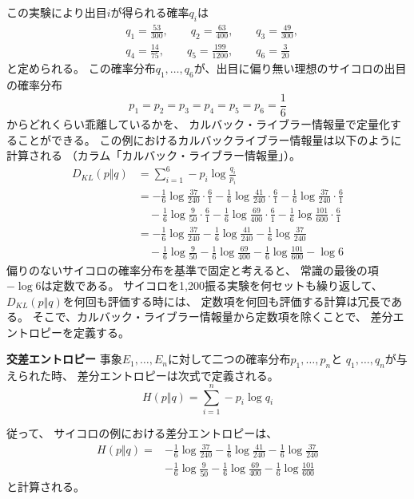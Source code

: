 この実験により出目$i$が得られる確率$q_i$は
\begin{align*}
  &
    q_1 = \frac{53}{300}, \qquad
q_2 = \frac{63}{400}, \qquad
    q_3 = \frac{49}{300},
    \\&
q_4 = \frac{14}{75}, \qquad
q_5 = \frac{199}{1200}, \qquad
q_6 = \frac{3}{20}    
\end{align*}
と定められる。
この確率分布$q_1, \dots, q_6$が、出目に偏り無い理想のサイコロの出目の確率分布
\[
  p_1 = p_2 = p_3 = p_4 = p_5 = p_6 = \frac 16
\]
からどれくらい乖離しているかを、
カルバック・ライブラー情報量で定量化することができる。
この例におけるカルバックライブラー情報量は以下のように計算される
（カラム「カルバック・ライブラー情報量」）。
\begin{align*}
  D_{KL}(p \Vert q)
  & 
    = \sum_{i = 1}^6 - p_i \log \frac{q_i}{p_i}
  \\&
  = - \frac 16 \log \frac{37}{240} \cdot \frac 61
  - \frac 16 \log \frac{41}{240} \cdot \frac 61
  - \frac 16 \log \frac{37}{240} \cdot \frac 61
  \\&\quad
  - \frac 16 \log \frac{9}{50} \cdot \frac 61
  - \frac 16 \log \frac{69}{400} \cdot \frac 61
  - \frac 16 \log \frac{101}{600} \cdot \frac 61
  \\&
  = - \frac 16 \log \frac{37}{240}
  - \frac 16 \log \frac{41}{240}
  - \frac 16 \log \frac{37}{240}
  \\&\quad
  - \frac 16 \log \frac{9}{50}
  - \frac 16 \log \frac{69}{400}
  - \frac 16 \log \frac{101}{600}
  - \log 6
\end{align*}
偏りのないサイコロの確率分布を基準で固定と考えると、
常識の最後の項$- \log 6$は定数である。
サイコロを1,200振る実験を何セットも繰り返して、
$D_{KL}(p \Vert q)$を何回も評価する時には、
定数項を何回も評価する計算は冗長である。
そこで、カルバック・ライブラー情報量から定数項を除くことで、
差分エントロピーを定義する。

\begin{itembox}{\bf 交差エントロピー}
  事象$E_1, \dots, E_n$に対して二つの確率分布$p_1, \dots, p_n$と
  $q_1, \dots, q_n$が与えられた時、
  差分エントロピーは次式で定義される。
  \[
    H(p\Vert q) = \sum_{i=1}^n - p_i \log q_i
  \]
\end{itembox}
従って、
サイコロの例における差分エントロピーは、
\begin{align*}
  H(p\Vert q) = 
  &
  - \frac 16 \log \frac{37}{240}
  - \frac 16 \log \frac{41}{240}
  - \frac 16 \log \frac{37}{240}
  \\&
  - \frac 16 \log \frac{9}{50}
  - \frac 16 \log \frac{69}{400}
  - \frac 16 \log \frac{101}{600}
\end{align*}
と計算される。

